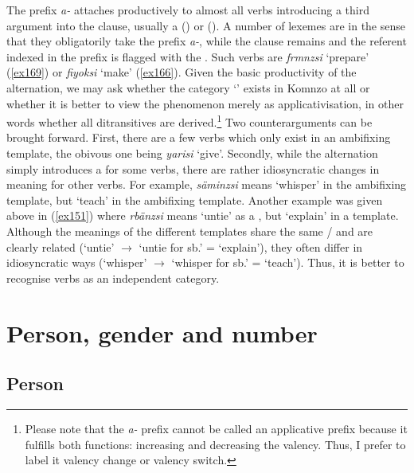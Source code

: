 The  prefix \emph{a-} attaches productively to almost all  verbs introducing a third argument into the clause, usually a  () or  (). A number of lexemes are  in the sense that they obligatorily take the  prefix \emph{a-}, while the clause remains  and the referent indexed in the prefix is flagged with the  . Such  verbs are \emph{frmnzsi} `prepare' (\ref{ex169}) or \emph{fiyoksi} `make' (\ref{ex166}). Given the basic productivity of the  alternation, we may ask whether the category `' exists in Komnzo at all or whether it is better to view the phenomenon merely as applicativisation, in other words whether all ditransitives are derived.\footnote{Please note that the \emph{a-} prefix cannot be called an applicative prefix because it fulfills both functions: increasing and decreasing the valency. Thus, I prefer to label it valency change or valency switch.} Two counterarguments can be brought forward. First, there are a few verbs which only exist in an ambifixing  template, the obivous one being \emph{yarisi} `give'. Secondly, while the  alternation simply introduces a  for some verbs, there are rather idiosyncratic changes in meaning for other verbs. For example, \emph{säminzsi} means `whisper' in the ambifixing  template, but `teach' in the ambifixing  template. Another example was given above in (\ref{ex151}) where \emph{rbänzsi} means `untie' as a , but `explain' in a  template. Although the meanings of the different templates share the same / and are clearly related (`untie' $\rightarrow$ `untie for sb.' = `explain'), they often differ in idiosyncratic ways (`whisper' $\rightarrow$ `whisper for sb.' = `teach'). Thus, it is better to recognise  verbs as an independent category.

\section{Person, gender and number} \label{persgendnumber}

\subsection{Person} \label{personsection}

